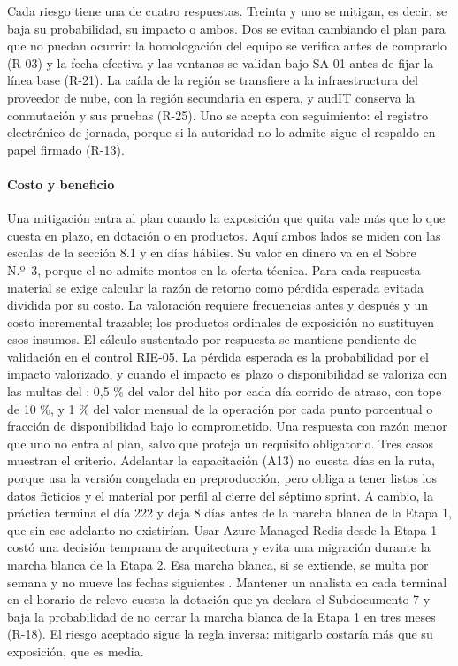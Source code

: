 Cada riesgo tiene una de cuatro respuestas. Treinta y uno se mitigan, es decir, se baja su probabilidad,
su impacto o ambos. Dos se evitan cambiando el plan para que no puedan ocurrir: la homologación del
equipo se verifica antes de comprarlo (R-03) y la fecha efectiva y las ventanas se validan bajo SA-01 antes de fijar la línea base (R-21). La
caída de la región se transfiere a la infraestructura del proveedor de nube, con la región secundaria en
espera, y audIT conserva la conmutación y sus pruebas (R-25). Uno se acepta con seguimiento: el registro
electrónico de jornada, porque si la autoridad no lo admite sigue el respaldo en papel firmado (R-13).

\paragraph{Costo y beneficio}
Una mitigación entra al plan cuando la exposición que quita vale más que lo que cuesta en plazo, en
dotación o en productos. Aquí ambos lados se miden con las escalas de la sección 8.1 y en días hábiles.
Su valor en dinero va en el Sobre N.º~3, porque el  no admite montos en la oferta técnica.
Para cada respuesta material se exige calcular la razón de retorno como pérdida esperada evitada dividida por su costo. La valoración requiere frecuencias antes y después y un costo incremental trazable; los productos ordinales de exposición no sustituyen esos insumos. El cálculo sustentado por respuesta se mantiene pendiente de validación en el control RIE-05. La pérdida esperada es la probabilidad por el impacto valorizado, y cuando el impacto es plazo o
disponibilidad se valoriza con las multas del : 0,5 \% del valor del hito por cada día
corrido de atraso, con tope de 10 \%, y 1 \% del valor mensual de la operación por cada punto porcentual
o fracción de disponibilidad bajo lo comprometido. Una respuesta con razón menor que uno no entra al plan, salvo que proteja un
requisito obligatorio. Tres casos muestran el criterio. Adelantar la capacitación (A13) no cuesta días en la ruta, porque usa
la versión congelada en preproducción, pero obliga a tener listos los datos ficticios y el material por
perfil al cierre del séptimo sprint. A cambio, la práctica termina el día 222 y deja 8 días antes de la
marcha blanca de la Etapa 1, que sin ese adelanto no existirían. Usar Azure Managed Redis desde la Etapa 1 costó una decisión temprana de
arquitectura y evita una migración durante la marcha blanca de la Etapa 2. Esa marcha blanca, si se
extiende, se multa por semana  y no mueve las fechas siguientes . Mantener un
analista en cada terminal en el horario de relevo cuesta la dotación que ya declara el Subdocumento 7 y
baja la probabilidad de no cerrar la marcha blanca de la Etapa 1 en tres meses (R-18). El riesgo
aceptado sigue la regla inversa: mitigarlo costaría más que su exposición, que es media.

